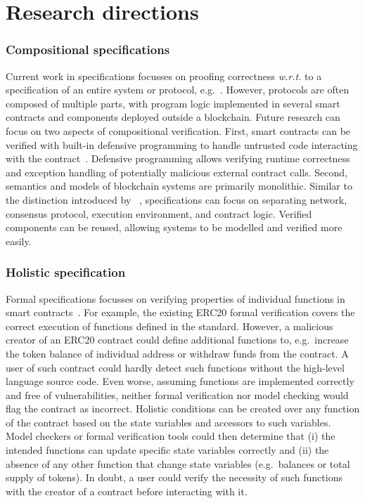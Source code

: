 \section{Research directions}
\label{discuss}

\subsubsection{Compositional specifications}
Current work in specifications focusses on proofing correctness \emph{w.r.t.} to a specification of an entire system or protocol, e.g.~\cite{Palmskog2018,Pirlea2018}.
However, protocols are often composed of multiple parts, with program logic implemented in several smart contracts and components deployed outside a blockchain.
Future research can focus on two aspects of compositional verification.
First, smart contracts can be verified with built-in defensive programming to handle untrusted code interacting with the contract~\cite{Miller2018smart}.
Defensive programming allows verifying runtime correctness and exception handling of potentially malicious external contract calls.
Second, semantics and models of blockchain systems are primarily monolithic.
Similar to the distinction introduced by \citeauthor{Bonneau2015}~\cite{Bonneau2015}, specifications can focus on separating network, consensus protocol, execution environment, and contract logic.
Verified components can be reused, allowing systems to be modelled and verified more easily.

\subsubsection{Holistic specification}
Formal specifications focusses on verifying properties of individual functions in smart contracts~\cite{Hildenbrandt2017}.
For example, the existing ERC20 formal verification covers the correct execution of functions defined in the standard.
However, a malicious creator of an ERC20 contract could define additional functions to, e.g.\ increase the token balance of individual address or withdraw funds from the contract.
A user of such contract could hardly detect such functions without the high-level language source code.
Even worse, assuming functions are implemented correctly and free of vulnerabilities, neither formal verification nor model checking would flag the contract as incorrect.
Holistic conditions can be created over any function of the contract based on the state variables and accessors to such variables.
Model checkers or formal verification tools could then determine that (i) the intended functions can update specific state variables correctly and (ii) the absence of any other function that change state variables (e.g.\ balances or total supply of tokens).
In doubt, a user could verify the necessity of such functions with the creator of a contract before interacting with it.

